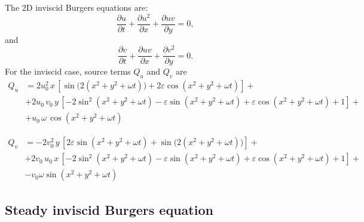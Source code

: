 \documentclass[10pt]{article}
\newcommand{\diff}[2] {\dfrac{\partial #1}{\partial #2}}
\begin{document}
The 2D inviscid Burgers  equations are:
\begin{equation}
 \label{eq:burgers2d_05}
\diff{ u}{t} + \diff{ u^2 }{x}+\diff{uv}{y}=0,
\end{equation}
and
\begin{equation}
 \label{eq:burgers2d_06}
 \diff{ v}{t}+ \diff{ u v}{x} + \diff{  v^2 }{y}=0.
\end{equation}
%
For the inviscid case, source terms $Q_u$ and $Q_v$ are
\begin{equation}
\begin{split}
Q_u &= 2 u_0^2\, x\,[\sin\big(2(x^2+y^2+\omega t)\big)+2 \varepsilon \cos(x^2+y^2+\omega t)] +\\
&+2 u_0\, v_0\, y\,[-2 \sin^2(x^2+y^2+\omega t)-\varepsilon \sin(x^2+y^2+\omega t)+\varepsilon \cos(x^2+y^2+\omega t)+1] +\\
&+u_0\, \omega\, \cos(x^2+y^2+\omega t)
\end{split}
 \end{equation}

\begin{equation}
\begin{split}
Q_v &= -2 v_0^2\, y\,[2 \varepsilon \sin(x^2+y^2+\omega t)+\sin\big(2(x^2+y^2+\omega t)\big)] +\\
&+2 v_0\, u_0\, x\,[-2 \sin^2(x^2+y^2+\omega t)-\varepsilon \sin(x^2+y^2+\omega t)+\varepsilon \cos(x^2+y^2+\omega t)+1] +\\
&-v_0 \omega \sin(x^2+y^2+\omega t)
 \end{split}
\end{equation}

\subsection{Steady inviscid Burgers equation}
\end{document}
